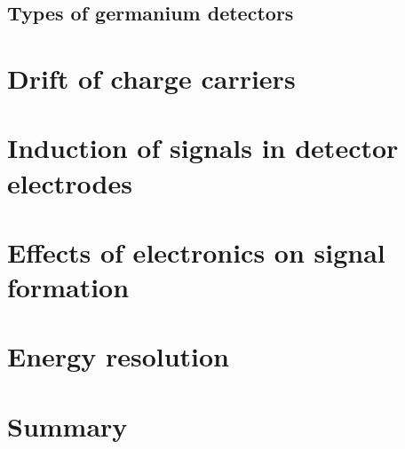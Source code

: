 \subsection{Types of germanium detectors}
\label{sec:det:type}


\section{Drift of charge carriers}
\label{sec:det:drift}

\section{Induction of signals in detector electrodes}
\label{sec:det:lamo}

\section{Effects of electronics on signal formation}
\label{sec:det:elec}

\section{Energy resolution}
\label{sec:det:temp}

\section{Summary}
\label{sec:det:sum}



